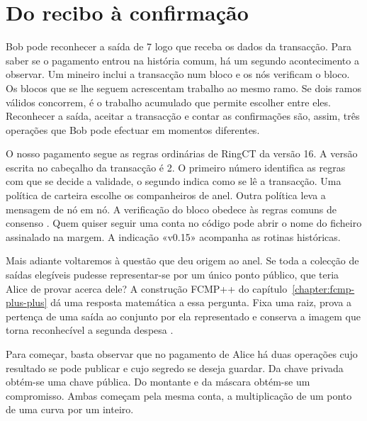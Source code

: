 \section{Do recibo à confirmação}
\label{sec:technical-scope}

Bob pode reconhecer a saída de 7 logo que receba os dados da
transacção. Para saber se o pagamento entrou na história comum, há
um segundo acontecimento a observar. Um mineiro inclui a transacção
num bloco e os nós verificam o bloco. Os blocos que se lhe seguem
acrescentam trabalho ao mesmo ramo. Se dois ramos válidos concorrem,
é o trabalho acumulado que permite escolher entre eles. Reconhecer
a saída, aceitar a transacção e contar as confirmações são, assim,
três operações que Bob pode efectuar em momentos diferentes.

O nosso pagamento segue as regras ordinárias de RingCT da versão 16.
A versão escrita no cabeçalho da transacção é 2. O primeiro número
identifica as regras com que se decide a validade, o segundo indica
como se lê a transacção. Uma política de carteira escolhe os
companheiros de anel. Outra política leva a mensagem de nó em nó.
A verificação do bloco obedece às regras comuns de consenso
\cite{monero-source-v16}.
%
Quem quiser seguir uma conta no código pode abrir o nome do ficheiro
assinalado na margem. A indicação «v0.15» acompanha as rotinas históricas.

Mais adiante voltaremos à questão que deu origem ao anel. Se toda a
colecção de saídas elegíveis pudesse representar-se por um único
ponto público, que teria Alice de provar acerca dele? A construção
FCMP++ do capítulo~\ref{chapter:fcmp-plus-plus} dá uma resposta
matemática a essa pergunta. Fixa uma raiz, prova a pertença de uma
saída ao conjunto por ela representado e conserva a imagem que torna
reconhecível a segunda despesa
\cite{fcmp-plus-plus-paper,fcmp-composition-review}.

Para começar, basta observar que no pagamento de Alice há duas
operações cujo resultado se pode publicar e cujo segredo se deseja
guardar. Da chave privada obtém-se uma chave pública. Do montante e
da máscara obtém-se um compromisso. Ambas começam pela mesma conta,
a multiplicação de um ponto de uma curva por um inteiro.
